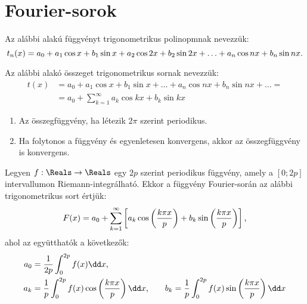 \clearpage
\section{Fourier-sorok}\label{sec-02-03}

\begin{definition}
  Az alábbi alakú függvényt trigonometrikus polinopmnak nevezzük:
  $$
    t_n(x)
    = a_0
    + a_1 \cos x + b_1 \sin x
    + a_2 \cos 2x + b_2 \sin 2x
    + \ldots
    + a_n \cos nx + b_n \sin nx
    \text.
  $$
\end{definition}

\begin{definition}
  Az alábbi alakó összeget trigonometrikus sornak nevezzük:
  \begin{align*}
    t(x)
     & = a_0
    + a_1 \cos x + b_1 \sin x
    + \ldots
    + a_n \cos nx + b_n \sin nx
    + \ldots
    =
    \\
     & = a_0
    + \sum_{k=1}^{\infty} a_k \cos kx + b_k \sin kx
  \end{align*}
\end{definition}

\begin{note}
  \begin{enumerate}
    \item Az összegfüggvény, ha létezik $2\pi$ szerint periodikus.

    \item Ha folytonos a függvény és egyenletesen konvergens, akkor az
          összegfüggvény is konvergens.
  \end{enumerate}
\end{note}

\begin{definition}
  Legyen $f : \Reals \to \Reals$ egy $2p$ szerint periodikus függvény, amely a
  $[0; 2p]$ intervallumon Riemann-integrálható. Ekkor a függvény Fourier-során
  az alábbi trigonometrikus sort értjük:
  $$
    F(x)
    = a_0
    + \sum_{k=1}^{\infty} \left[
      a_k \cos \left(\frac{k\pi x}{p}\right) + b_k \sin \left(\frac{k\pi x}{p}\right)
    \right]
    \text,
  $$
  ahol az együtthatók a következők:
  \begin{align*}
    a_0 & = \frac{1}{2p} \int_{0}^{2p} f(x) \dd x
    \text,                                                                          \\
    a_k & = \frac{1}{p} \int_{0}^{2p} f(x) \cos \left(\frac{k\pi x}{p}\right) \dd x
    \text,                                                                           \qquad
    b_k = \frac{1}{p} \int_{0}^{2p} f(x) \sin \left(\frac{k\pi x}{p}\right) \dd x
  \end{align*}
\end{definition}


